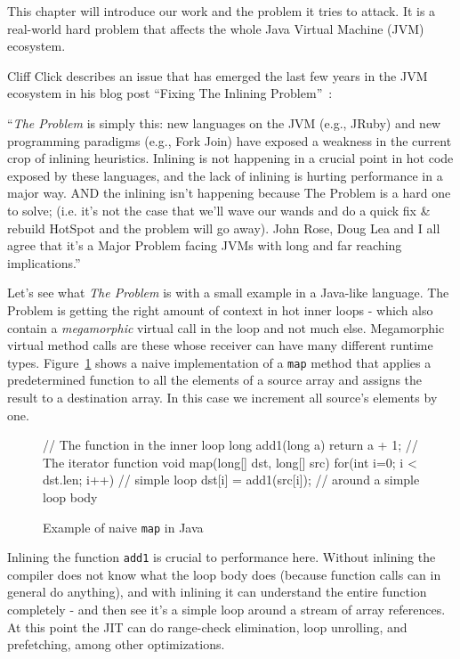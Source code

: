 \label{introduction}
This chapter will introduce our work and the problem it tries to attack. It is a
real-world hard problem that affects the whole Java Virtual Machine (JVM) ecosystem.

Cliff Click describes an issue that has emerged the last few years in the JVM ecosystem in his blog post ``Fixing The Inlining Problem''~\cite{cliffc:TheProblem}:

``\emph{The Problem} is simply this: new languages on the JVM (e.g., JRuby) and new
programming paradigms (e.g., Fork Join) have exposed a weakness in the current
crop of inlining heuristics.  Inlining is not happening in a crucial point in
hot code exposed by these languages, and the lack of inlining is hurting
performance in a major way.  AND the inlining isn't happening because The
Problem is a hard one to solve; (i.e. it's not the case that we'll wave our
wands and do a quick fix \& rebuild HotSpot and the problem will go away).  
John Rose, Doug Lea and I all agree that it's a Major Problem facing JVMs with long
and far reaching implications.''

Let's see what \emph{The Problem} is with a small example in a Java-like language. The
Problem is getting the right amount of context in hot inner loops - which also
contain a \emph{megamorphic} virtual call in the loop and not much else. Megamorphic virtual method calls are these whose receiver can have many different runtime types. Figure~\ref{java_naive_map} 
shows a naive implementation of a \texttt{map} method that applies a predetermined
function to all the elements of a source array and assigns the result to a
destination array. In this case we increment all source's elements by one.

\begin{figure}
\begin{javaCode}
// The function in the inner loop
long add1(long a) {return a + 1;}
// The iterator function
void map(long[] dst, long[] src) {
  for(int i=0; i < dst.len; i++) // simple loop
    dst[i] = add1(src[i]); // around a simple loop body
}
\end{javaCode}
\caption[Example of naive \texttt{map} in Java]{Example of naive \texttt{map} in Java}
\label{java_naive_map}
\end{figure}

Inlining the function \texttt{add1} is crucial to performance here.  Without
inlining the compiler does not know what the loop body does (because function
calls can in general do anything), and with inlining it can understand the
entire function completely - and then see it's a simple loop around a stream of
array references.  At this point the JIT can do range-check elimination, loop
unrolling, and prefetching, among other optimizations.

